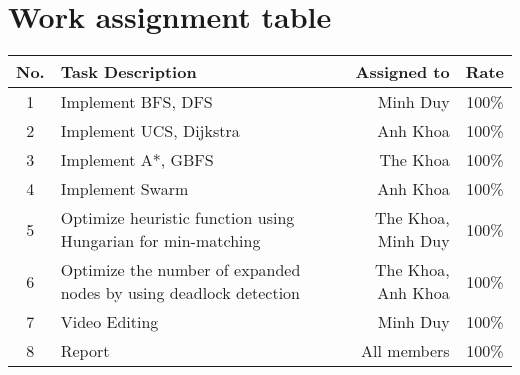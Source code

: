 \section{Work assignment table}
\begin{center}
  \renewcommand{\arraystretch}{1.5}
  \begin{tabular}{|c|p{}|r|c|}
    \hline
    \textbf{No.} & \textbf{Task Description}                                         & \textbf{Assigned to} & \textbf{Rate} \\\hline
    1            & Implement BFS, DFS                                                & Minh Duy             & 100\%         \\\hline
    2            & Implement UCS, Dijkstra                                           & Anh Khoa             & 100\%         \\\hline
    3            & Implement A*, GBFS                                                & The Khoa             & 100\%         \\\hline
    4            & Implement Swarm                                                   & Anh Khoa             & 100\%         \\\hline
    5            & Optimize heuristic function using Hungarian for min-matching      & The Khoa, Minh Duy   & 100\%         \\\hline
    6            & Optimize the number of expanded nodes by using deadlock detection & The Khoa, Anh Khoa   & 100\%         \\\hline
    7            & Video Editing                                                     & Minh Duy             & 100\%         \\\hline
    8            & Report                                                            & All members          & 100\%         \\\hline
  \end{tabular}
\end{center}
